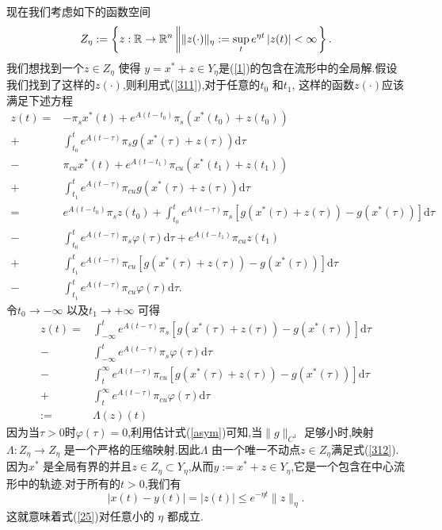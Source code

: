 现在我们考虑如下的函数空间
\begin{equation}
Z_\eta := \left\{ z:\mathbb{R}\to \mathbb{R}^{n}\left\| \|z(\cdot )\|_{\eta}:=\sup_{t}e^{\eta t}\left| z(t) \right| <\infty  \right. \right\} .
\end{equation}
我们想找到一个$z\in Z_\eta$ 使得 $y=x^{\ast}+z\in Y_\eta$是(\ref{1})的包含在流形中的全局解.假设我们找到了这样的$z(\cdot )$,则利用式(\ref{311}),对于任意的$t_0$ 和$t_1$, 这样的函数$z(\cdot )$应该满足下述方程
\begin{align*}
  z(t)=& -\pi_s x^{\ast}(t)+e^{A(t-t_0)}\pi_s(x^{\ast}(t_0)+z(t_0))\\
  +& \int_{t_0}^{t}e^{A(t-\tau)}\pi_sg\left(x^{\ast}(\tau)+z(\tau)\right)\mathrm{d}\tau\\
  -& \pi_{cu}x^{\ast}(t)+e^{A(t-t_1)}\pi_{cu}\left( x^{\ast}(t_1)+z(t_1) \right)\\
  + & \int_{t_1}^{t}e^{A(t-\tau)}\pi_{cu}g\left( x^{\ast}(\tau)+z(\tau) \right) \mathrm{d}\tau\\
  =& e^{A(t-t_0)}\pi_sz(t_0)+\int_{t_0}^{t}e^{A(t-\tau)}\pi_s\left[ g\left( x^{\ast}(\tau)+z(\tau) \right) -g\left( x^{\ast}(\tau) \right)  \right] \mathrm{d}\tau\\
  -& \int_{t_0}^{t}e^{A(t-\tau)}\pi_s\varphi(\tau)\mathrm{d}\tau+e^{A(t-t_1)}\pi_{cu}z(t_1)\\
  + & \int_{t_1}^{t}e^{A(t-\tau)}\pi_{cu}\left[ g\left( x^{\ast}(\tau)+z(\tau) \right) -g\left( x^{\ast}(\tau) \right)  \right] \mathrm{d}\tau\\
  -& \int_{t_1}^{t}e^{A(t-\tau)}\pi_{cu}\varphi(\tau)\mathrm{d}\tau
.\end{align*}
令$t_0\to-\infty$ 以及$t_1\to +\infty$ 可得
\begin{equation}
  \begin{aligned}
    z(t)=& \int_{-\infty}^{t}e^{A(t-\tau)}\pi_s\left[ g\left( x^{\ast}(\tau)+z(\tau) \right) -g\left( x^{\ast}(\tau) \right)  \right] \mathrm{d}\tau\\
    -& \int_{-\infty}^{t}e^{A(t-\tau)}\pi_s\varphi(\tau)\mathrm{d}\tau\\
    -& \int_{t}^{\infty}e^{A(t-\tau)}\pi_{cu}\left[ g\left( x^{\ast}(\tau)+z(\tau) \right) -g\left( x^{\ast}(\tau) \right)  \right] \mathrm{d}\tau\\
    +& \int_{t}^{\infty}e^{A(t-\tau)}\pi_{cu}\varphi(\tau)\mathrm{d}\tau\\
    :=&\Lambda(z)(t)
  \end{aligned}\label{312}
\end{equation}
因为当$\tau>0$时$\varphi(\tau)=0$,利用估计式(\ref{asym})可知,当$\|g\|_{C^{1}}$ 足够小时,映射$\Lambda:Z_{\eta}\to Z_{\eta}$ 是一个严格的压缩映射.因此$\Lambda$ 由一个唯一不动点$z\in Z_\eta$满足式(\ref{312}).因为$x^{\ast}$ 是全局有界的并且$z\in Z_\eta\subset Y_{\eta}$,从而$y:=x^{\ast}+z\in Y_{\eta}$,它是一个包含在中心流形中的轨迹.对于所有的$t>0$,我们有
 \[
   \left| x(t)-y(t) \right| =\left| z(t) \right| \le e^{-\eta t}\|z\|_{\eta}.
\]
这就意味着式(\ref{25})对任意小的 $\eta$ 都成立.

